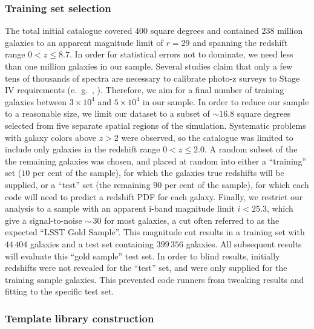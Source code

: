 
\subsubsection{Training set selection}
\label{sec:buzztraining}

The total initial catalogue covered $400$ square degrees and contained $238$ million galaxies to an apparent magnitude limit of $r\!=\!29$ and spanning the redshift range $0\!<\!z\!\leq\!8.7$.  In order for statistical errors not to dominate, we need less than one million galaxies in our sample.
Several studies claim that only a few tens of thousands of spectra are necessary to calibrate photo-z surveys to Stage IV requirements (e.~g.~\citet{Bernstein:10}, \citet{Masters:2017}).
Therefore, we aim for a final number of training galaxies between $3\times 10^{4}$ and $5\times 10^{4}$ in our sample.
In order to reduce our sample to a reasonable size, we limit our dataset to a subset of $\sim\!16.8$ square degrees selected from five separate spatial regions of the simulation.
Systematic problems with galaxy colors above $z\!>\!2$ were observed, so the catalogue was limited to include only galaxies in the redshift range $0\!<\!z\!\leq\!2.0$.
A random subset of the the remaining galaxies was chosen, and placed at random into either a ``training'' set ($10$ per cent of the sample), for which the galaxies true redshifts will be supplied, or a ``test'' set (the remaining $90$ per cent of the sample), for which each code will need to predict a redshift PDF for each galaxy.
Finally, we restrict our analysis to a sample with an apparent i-band magnitude limit $i<25.3$, which give a signal-to-noise $\sim\,30$ for most galaxies, a cut often referred to as the expected ``LSST Gold Sample''.
This magnitude cut results in a training set with $44\,404$ galaxies and a test set containing $399\,356$ galaxies.  All subsequent results will evaluate this ``gold sample'' test set.
In order to blind results, initially redshifts were not revealed for the ``test'' set, and were only supplied for the training sample galaxies.
This prevented code runners from tweaking results and fitting to the specific test set.

\subsubsection{Template library construction}
\label{sec:buzztemplates}

